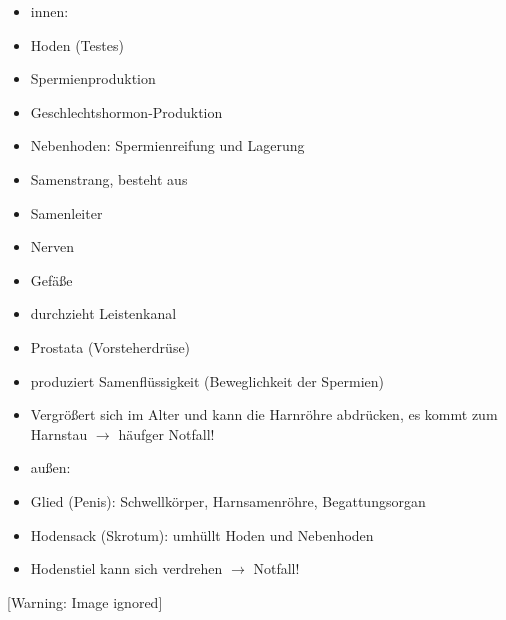 \documentclass{article}
\begin{document}
\begin{itemize}
\item innen:

\end{itemize}
\begin{itemize}
\item Hoden (Testes)

\end{itemize}
\begin{itemize}
\item Spermienproduktion

\item Geschlechtshormon-Produktion

\end{itemize}
\begin{itemize}
\item Nebenhoden: Spermienreifung und Lagerung

\item Samenstrang, besteht aus 

\end{itemize}
\begin{itemize}
\item Samenleiter

\item Nerven

\item Gef\"a{\ss}e

\item durchzieht Leistenkanal

\end{itemize}
\begin{itemize}
\item {}Prostata (Vorsteherdr\"use)

\end{itemize}
\begin{itemize}
\item produziert Samenfl\"ussigkeit (Beweglichkeit der Spermien)

\item Vergr\"o{\ss}ert sich im Alter und kann die Harnr\"ohre
abdr\"ucken, es kommt zum Harnstau ${\rightarrow}$ h\"aufger Notfall!

\end{itemize}
\begin{itemize}
\item au{\ss}en:

\end{itemize}
\begin{itemize}
\item Glied (Penis): Schwellk\"orper, Harnsamenr\"ohre, Begattungsorgan

\item Hodensack (Skrotum): umh\"ullt Hoden und Nebenhoden

\end{itemize}
\begin{itemize}
\item Hodenstiel kann sich verdrehen ${\rightarrow}$ Notfall!

\end{itemize}
  [Warning: Image ignored] %
 
\end{document}
